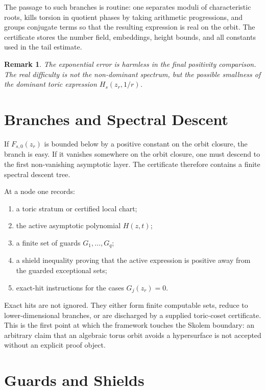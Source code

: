 \documentclass[11pt]{article}
\newtheorem{remark}[theorem]{Remark}
\begin{document}
The passage to such branches is routine: one separates moduli of characteristic roots, kills torsion in quotient phases by taking arithmetic progressions, and groups conjugate terms so that the resulting expression is real on the orbit. The certificate stores the number field, embeddings, height bounds, and all constants used in the tail estimate.

\begin{remark}
The exponential error is harmless in the final positivity comparison. The real difficulty is not the non-dominant spectrum, but the possible smallness of the dominant toric expression \(H_s(z_r,1/r)\).
\end{remark}

\section{Branches and Spectral Descent}

If \(F_{s,0}(z_r)\) is bounded below by a positive constant on the orbit closure, the branch is easy. If it vanishes somewhere on the orbit closure, one must descend to the first non-vanishing asymptotic layer. The certificate therefore contains a finite spectral descent tree.

At a node one records:
\begin{enumerate}[label=(\roman*)]
\item a toric stratum or certified local chart;
\item the active asymptotic polynomial \(H(z,t)\);
\item a finite set of guards \(G_1,\ldots,G_q\);
\item a shield inequality proving that the active expression is positive away from the guarded exceptional sets;
\item exact-hit instructions for the cases \(G_j(z_r)=0\).
\end{enumerate}

Exact hits are not ignored. They either form finite computable sets, reduce to lower-dimensional branches, or are discharged by a supplied toric-coset certificate. This is the first point at which the framework touches the Skolem boundary: an arbitrary claim that an algebraic torus orbit avoids a hypersurface is not accepted without an explicit proof object.

\section{Guards and Shields}
\end{document}
